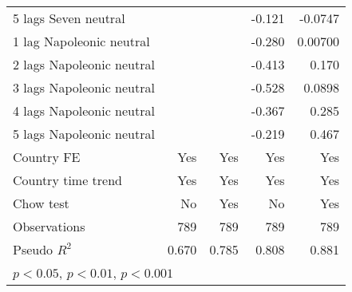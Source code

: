 \begin{table}[htbp]
\begin{tabular}{l*{4}{D{.}{.}{-1}}}
5 lags Seven neutral&                     &                     &      -0.121         &     -0.0747         \\
1 lag Napoleonic neutral&                     &                     &      -0.280         &     0.00700         \\
2 lags Napoleonic neutral&                     &                     &      -0.413\sym{*}  &       0.170         \\
3 lags Napoleonic neutral&                     &                     &      -0.528\sym{**} &      0.0898         \\
4 lags Napoleonic neutral&                     &                     &      -0.367         &       0.285         \\
5 lags Napoleonic neutral&                     &                     &      -0.219         &       0.467\sym{*}  \\
Country FE          &         Yes         &         Yes         &         Yes         &         Yes         \\
Country time trend  &         Yes         &         Yes         &         Yes         &         Yes         \\
Chow test           &          No         &         Yes         &          No         &         Yes         \\
\hline
Observations        &         789         &         789         &         789         &         789         \\
Pseudo \(R^{2}\)    &       0.670         &       0.785         &       0.808         &       0.881         \\
\hline\hline
{}\\
\end{tabular}
\end{table}
